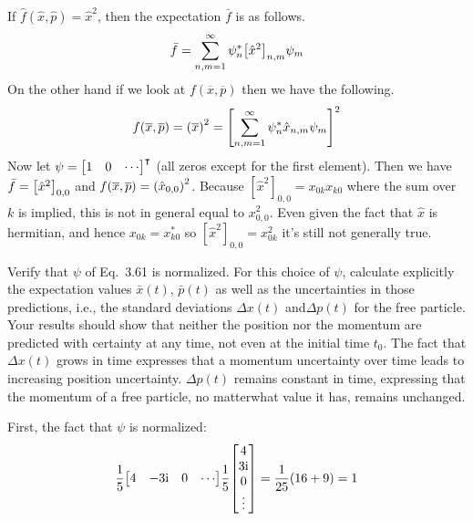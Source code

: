 \documentclass[boxes,pages]{homework}
\makeatletter
\newcommand{\iu}{\mathrm{i}}
\numberwithin{@problem}{section}
\makeatother
\begin{document}
\begin{solution}
	If $\hat{f}(\hat{x}, \hat{p}) = \hat{x}^2$, then the expectation $\bar{f}$ is as follows.
	\begin{equation*}
		\bar{f} = \sum_{n, m = 1}^\infty\psi_n^*\qty[\hat{x}^2]_{n,m}\psi_m
	\end{equation*}
	On the other hand if we look at $f(\overline{x}, \overline{p})$ then we have the following.
	\begin{equation*}
		f(\overline{x}, \overline{p}) = \qty(\overline{x})^2 = \qty[\sum_{n, m = 1}^\infty\psi_n^*\hat{x}_{n,m}\psi_m]^2
	\end{equation*}
	Now let $\psi = \mqty[1 & 0 & \cdots]^\intercal$ (all zeros except for the first element). Then we have $\bar{f} = \qty[\hat{x}^2]_{0,0}$ and $f(\overline{x}, \overline{p}) = \qty(\hat{x}_{0, 0})^2$. Because $[\hat{x}^2]_{0,0} = x_{0k}x_{k0}$ where the sum over $k$ is implied, this is not in general equal to $x_{0,0}^2$. Even given the fact that $\hat{x}$ is hermitian, and hence $x_{0k} = x_{k0}^*$ so $[\hat{x}^2]_{0,0} = x_{0k}^2$ it's still not generally true.
\end{solution}

\begin{problem}
Verify that $\psi$ of Eq.\ 3.61 is normalized. For this choice of $\psi$, calculate explicitly the expectation values $\bar{x}(t)$, $\bar{p}(t)$ as well as the uncertainties in those predictions, i.e., the standard deviations $\Delta x(t)$ and$\Delta p(t)$ for the free particle. Your results should show that neither the position nor the momentum are predicted with certainty at any time, not even at the initial time $t_0$. The fact that $\Delta x(t)$ grows in time expresses that a momentum uncertainty over time leads to increasing position uncertainty. $\Delta p(t)$ remains constant in time, expressing that the momentum of a free particle, no matterwhat value it has, remains unchanged.
\end{problem}

\begin{solution}
	First, the fact that $\psi$ is normalized:
	\begin{equation*}
		\frac{1}{5}\mqty[4 & -3\iu & 0 & \cdots]\frac{1}{5}\mqty[4 \\ 3\iu \\ 0 \\ \vdots] = \frac{1}{25}\qty(16 + 9) = 1
	\end{equation*}
\end{solution}
\end{document}
